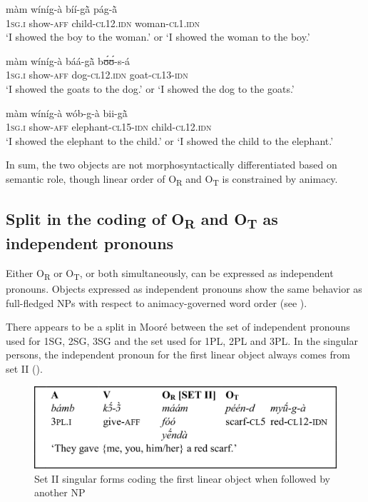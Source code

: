 \documentclass[output=paper]{langsci/langscibook}
\begin{document}
\ea
\label{ex:16.pacchiarotti}
\gll màm    wíníg-à    bíí-g\`{ã}      pág-\`{ã} \\
\textsc{1sg.i}    show-\textsc{aff}    child-\textsc{cl12.idn}  woman-\textsc{cl1.idn}\\
\glt`I showed the boy to the woman.' or `I showed the woman to the boy.'
\z

\ea
\label{ex:17.pacchiarotti}
\gll màm    wíníg-à    báá-g\`{ã}    bʊ́ʊ́-s-á \\
\textsc{1sg.i}    show-\textsc{aff}    dog-\textsc{cl12.idn}  goat-\textsc{cl13-idn}\\
\glt`I showed the goats to the dog.' or `I showed the dog to the goats.'  
\z

\ea
\label{ex:18.pacchiarotti}
\gll màm    wíníg-à    wób-g-à    bii-g\`{ã} \\
\textsc{1sg.i}    show-\textsc{aff}    elephant-\textsc{cl15-idn}  child-\textsc{cl12.idn}\\
\glt `I showed the elephant to the child.' or `I showed the child to the elephant.'
\z

In sum, the two objects are not morphosyntactically differentiated based on semantic role, though linear order of O\textsubscript{R} and O\textsubscript{T} is constrained by animacy.

\subsection{Split in the coding of O\textsubscript{R} and O\textsubscript{T} as independent pronouns}\label{§4.3:split.pacchiarotti}

Either O\textsubscript{R} or O\textsubscript{T}, or both simultaneously, can be expressed as independent pronouns. Objects expressed as independent pronouns show the same behavior as full-fledged NPs with respect to animacy-governed word order (see ). 

There appears to be a split in Mooré between the set of independent pronouns used for 1SG, 2SG, 3SG and the set used for 1PL, 2PL and 3PL. In the singular persons, the independent pronoun for the first linear object always comes from set II (). 

\begin{figure}[h]
\includegraphics[width=\textwidth]{figures/pacchiarottifig1}
\caption{Set II singular forms coding the first linear object when followed by another NP}
\label{fig:1.pacchiarotti}
\end{figure}
\end{document}
